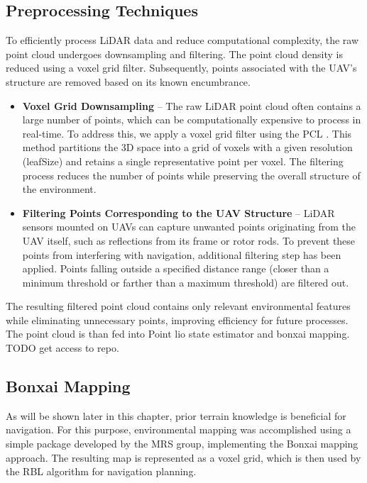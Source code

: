         \subsection{Preprocessing Techniques}
            To efficiently process \ac{LiDAR} data and reduce computational complexity, the raw point cloud undergoes downsampling and filtering. 
            The point cloud density is reduced using a voxel grid filter. 
            Subsequently, points associated with the \ac{UAV}'s structure are removed based on its known encumbrance.
            \begin{itemize}
                \item \textbf{Voxel Grid Downsampling} -- The raw \ac{LiDAR} point cloud often contains a large number of points, which can be computationally expensive to process in real-time. 
                To address this, we apply a voxel grid filter using the \ac{PCL} \cite{pcl_voxelgrid}. 
                This method partitions the 3D space into a grid of voxels with a given resolution (leafSize) and retains a single representative point per voxel. 
                The filtering process reduces the number of points while preserving the overall structure of the environment.
                \item \textbf{Filtering Points Corresponding to the UAV Structure} -- \ac{LiDAR} sensors mounted on \ac{UAV}s can capture unwanted points originating from the \ac{UAV} itself, such as reflections from its frame or rotor rods. 
                To prevent these points from interfering with navigation, additional filtering step has been applied.
                Points falling outside a specified distance range (closer than a minimum threshold or farther than a maximum threshold) are filtered out.
            \end{itemize}
            The resulting filtered point cloud contains only relevant environmental features while eliminating unnecessary points, improving efficiency for future processes.
            The point cloud is than fed into Point lio state estimator and bonxai mapping. TODO get access to repo.

        \subsection{Bonxai Mapping}
            As will be shown later in this chapter, prior terrain knowledge is beneficial for navigation. 
            For this purpose, environmental mapping was accomplished using a simple package developed by the MRS group, implementing the Bonxai mapping approach.
            The resulting map is represented as a voxel grid, which is then used by the \ac{RBL} algorithm for navigation planning.

